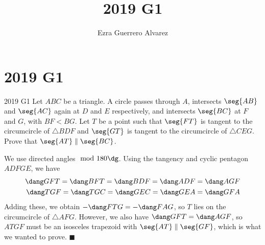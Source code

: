 \documentclass[14pt]{article}
\title{2019 G1}
\author{Ezra Guerrero Alvarez}
\begin{document}
\maketitle
	
\section*{2019 G1}

\begin{statement}{2019 G1}
	Let $ABC$ be a triangle.
	A circle passes through $A$,
	intersects $\seg{AB}$ and $\seg{AC}$ again at
	$D$ and $E$ respectively,
	and intersects $\seg{BC}$ at $F$ and $G$,
	with $BF < BG$.
	Let $T$ be a point such that $\seg{FT}$
	is tangent to the circumcircle of $\triangle BDF$
	and $\seg{GT}$ is tangent to the circumcircle
	of $\triangle CEG$.
	Prove that $\seg{AT} \parallel \seg{BC}$.
\end{statement}
We use directed angles$\mod 180\dg$. Using the tangency and cyclic pentagon $ADFGE$, we have
\begin{align*}
	\dang GFT = \dang BFT = \dang BDF = \dang ADF = \dang AGF \\
	\dang TGF = \dang TGC = \dang GEC = \dang GEA = \dang GFA 
\end{align*}
Adding these, we obtain $-\dang FTG = -\dang FAG$, so $T$ lies on the circumcircle of $\triangle AFG$. However, we also have $\dang GFT = \dang AGF$, so $ATGF$ must be an isosceles trapezoid with $\seg{AT}\parallel\seg{GF}$, which is what we wanted to prove. $\blacksquare$
	
\end{document}
